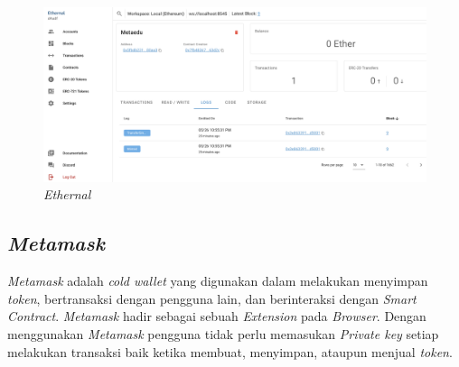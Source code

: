\begin{figure}[H] 
  \centering
    \includegraphics[scale=0.3]{gambar/img-ethernal.png}
    \caption{\emph{Ethernal}}
    \label{fig:Ethernal}
  \end{figure}

\subsection{\emph{Metamask}}

\emph{Metamask} adalah \emph{cold wallet} yang digunakan dalam melakukan menyimpan \emph{token}, bertransaksi dengan pengguna lain, dan berinteraksi dengan \emph{Smart Contract}. \emph{Metamask} hadir sebagai sebuah \emph{Extension} pada \emph{Browser}. Dengan menggunakan \emph{Metamask} pengguna tidak perlu memasukan \emph{Private key} setiap melakukan transaksi baik ketika membuat, menyimpan, ataupun menjual \emph{token}.

